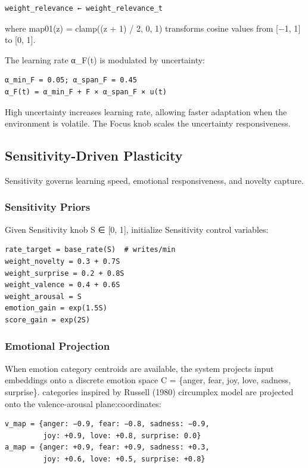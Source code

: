 \documentclass[
  letterpaper,
  DIV=11,
  numbers=noendperiod]{scrartcl}
\begin{document}
\begin{verbatim}
weight_relevance ← weight_relevance_t
\end{verbatim}

where map01(z) = clamp((z + 1) / 2, 0, 1) transforms cosine values from
{[}−1, 1{]} to {[}0, 1{]}.

The learning rate α\_F(t) is modulated by uncertainty:

\begin{verbatim}
α_min_F = 0.05; α_span_F = 0.45
α_F(t) = α_min_F + F × α_span_F × u(t)
\end{verbatim}

High uncertainty increases learning rate, allowing faster adaptation
when the environment is volatile. The Focus knob scales the uncertainty
responsiveness.

\subsection{Sensitivity-Driven
Plasticity}\label{sensitivity-driven-plasticity}

Sensitivity governs learning speed, emotional responsiveness, and
novelty capture.

\subsubsection{Sensitivity Priors}\label{sensitivity-priors}

Given Sensitivity knob S ∈ {[}0, 1{]}, initialize Sensitivity control
variables:

\begin{verbatim}
rate_target = base_rate(S)  # writes/min
weight_novelty = 0.3 + 0.7S
weight_surprise = 0.2 + 0.8S
weight_valence = 0.4 + 0.6S
weight_arousal = S
emotion_gain = exp(1.5S)
score_gain = exp(2S)
\end{verbatim}

\subsubsection{Emotional Projection}\label{sec-emotional-projection}

When emotion category centroids are available, the system projects input
embeddings onto a discrete emotion space C = \{anger, fear, joy, love,
sadness, surprise\}. categories inspired by Russell (1980) circumplex
model are projected onto the valence-arousal plane:coordinates:

\begin{verbatim}
v_map = {anger: −0.9, fear: −0.8, sadness: −0.9,
         joy: +0.9, love: +0.8, surprise: 0.0}
a_map = {anger: +0.9, fear: +0.9, sadness: +0.3,
         joy: +0.6, love: +0.5, surprise: +0.8}
\end{verbatim}
\end{document}
